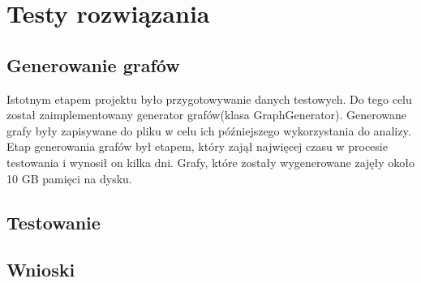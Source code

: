 \section{Testy rozwiązania}
	\label{final:testy}

	\subsection{Generowanie grafów}
		\label{final:testy:generowanie}

		Istotnym etapem projektu było przygotowywanie danych testowych. Do tego celu został zaimplementowany generator grafów(klasa GraphGenerator). Generowane grafy były zapisywane do pliku w celu ich późniejszego wykorzystania do analizy. Etap generowania grafów był etapem, który zajął najwięcej czasu w procesie testowania i wynosił on kilka dni. Grafy, które zostały wygenerowane zajęły około 10 GB pamięci na dysku.
	\subsection{Testowanie}
		\label{final:testy:przyklad1}
		
		
		
		
		
		
		
		

	\subsection{Wnioski}
		\label{final:testy:wnioski}
